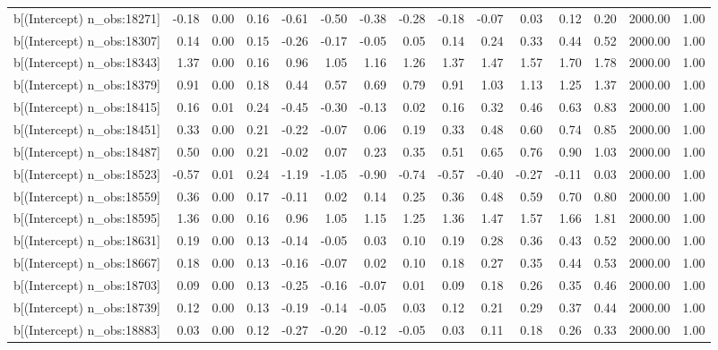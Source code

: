 \begin{table}[ht]
\begin{tabular}{rrrrrrrrrrrrrrr}
  b[(Intercept) n\_obs:18271] & -0.18 & 0.00 & 0.16 & -0.61 & -0.50 & -0.38 & -0.28 & -0.18 & -0.07 & 0.03 & 0.12 & 0.20 & 2000.00 & 1.00 \\ 
  b[(Intercept) n\_obs:18307] & 0.14 & 0.00 & 0.15 & -0.26 & -0.17 & -0.05 & 0.05 & 0.14 & 0.24 & 0.33 & 0.44 & 0.52 & 2000.00 & 1.00 \\ 
  b[(Intercept) n\_obs:18343] & 1.37 & 0.00 & 0.16 & 0.96 & 1.05 & 1.16 & 1.26 & 1.37 & 1.47 & 1.57 & 1.70 & 1.78 & 2000.00 & 1.00 \\ 
  b[(Intercept) n\_obs:18379] & 0.91 & 0.00 & 0.18 & 0.44 & 0.57 & 0.69 & 0.79 & 0.91 & 1.03 & 1.13 & 1.25 & 1.37 & 2000.00 & 1.00 \\ 
  b[(Intercept) n\_obs:18415] & 0.16 & 0.01 & 0.24 & -0.45 & -0.30 & -0.13 & 0.02 & 0.16 & 0.32 & 0.46 & 0.63 & 0.83 & 2000.00 & 1.00 \\ 
  b[(Intercept) n\_obs:18451] & 0.33 & 0.00 & 0.21 & -0.22 & -0.07 & 0.06 & 0.19 & 0.33 & 0.48 & 0.60 & 0.74 & 0.85 & 2000.00 & 1.00 \\ 
  b[(Intercept) n\_obs:18487] & 0.50 & 0.00 & 0.21 & -0.02 & 0.07 & 0.23 & 0.35 & 0.51 & 0.65 & 0.76 & 0.90 & 1.03 & 2000.00 & 1.00 \\ 
  b[(Intercept) n\_obs:18523] & -0.57 & 0.01 & 0.24 & -1.19 & -1.05 & -0.90 & -0.74 & -0.57 & -0.40 & -0.27 & -0.11 & 0.03 & 2000.00 & 1.00 \\ 
  b[(Intercept) n\_obs:18559] & 0.36 & 0.00 & 0.17 & -0.11 & 0.02 & 0.14 & 0.25 & 0.36 & 0.48 & 0.59 & 0.70 & 0.80 & 2000.00 & 1.00 \\ 
  b[(Intercept) n\_obs:18595] & 1.36 & 0.00 & 0.16 & 0.96 & 1.05 & 1.15 & 1.25 & 1.36 & 1.47 & 1.57 & 1.66 & 1.81 & 2000.00 & 1.00 \\ 
  b[(Intercept) n\_obs:18631] & 0.19 & 0.00 & 0.13 & -0.14 & -0.05 & 0.03 & 0.10 & 0.19 & 0.28 & 0.36 & 0.43 & 0.52 & 2000.00 & 1.00 \\ 
  b[(Intercept) n\_obs:18667] & 0.18 & 0.00 & 0.13 & -0.16 & -0.07 & 0.02 & 0.10 & 0.18 & 0.27 & 0.35 & 0.44 & 0.53 & 2000.00 & 1.00 \\ 
  b[(Intercept) n\_obs:18703] & 0.09 & 0.00 & 0.13 & -0.25 & -0.16 & -0.07 & 0.01 & 0.09 & 0.18 & 0.26 & 0.35 & 0.46 & 2000.00 & 1.00 \\ 
  b[(Intercept) n\_obs:18739] & 0.12 & 0.00 & 0.13 & -0.19 & -0.14 & -0.05 & 0.03 & 0.12 & 0.21 & 0.29 & 0.37 & 0.44 & 2000.00 & 1.00 \\ 
  b[(Intercept) n\_obs:18883] & 0.03 & 0.00 & 0.12 & -0.27 & -0.20 & -0.12 & -0.05 & 0.03 & 0.11 & 0.18 & 0.26 & 0.33 & 2000.00 & 1.00 \\ 

\end{tabular}
\end{table}
